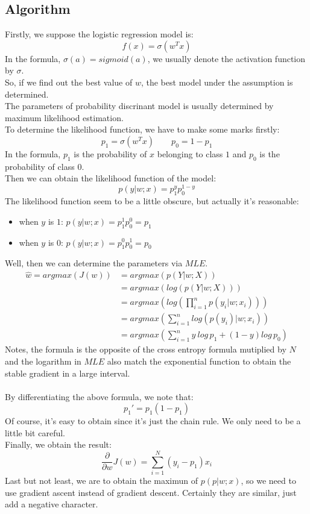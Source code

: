 \documentclass{report}
\begin{document}
\subsection{Algorithm}
Firstly, we suppose the logistic regression model is:
$$
f(x)=\sigma(w^Tx)
$$
In the formula, $\sigma(a)=sigmoid(a)$, we usually denote the activation function by $\sigma$.\\
So, if we find out the best value of $w$, the best model under the assumption is determined.\\
The parameters of probability discrinant model is usually determined by maximum likelihood estimation.\\
To determine the likelihood function, we have to make some marks firstly:
$$
p_1=\sigma(w^Tx) \qquad p_0=1-p_1
$$
In the formula, $p_1$ is the probability of $x$ belonging to class $1$ and $p_0$ is the probability of class $0$.\\
Then we can obtain the likelihood function of the model:
$$
p(y|w;x)=p_1^yp_0^{1-y}
$$
The likelihood function seem to be a little obscure, but actually it's reasonable:
\begin{itemize}
	\item when $y$ is $1$: $p(y|w;x)=p_1^1p_0^0=p_1$
	\item when $y$ is $0$: $p(y|w;x)=p_1^0p_0^1=p_0$
\end{itemize}
Well, then we can determine the parameters via $MLE$.
\begin{equation}
\begin{aligned}
\hat{w}=argmax(J(w))&=argmax(p(Y|w;X))\\
&=argmax(log(p(Y|w;X)))\\
&=argmax(log(\prod_{i=1}^n p(y_i|w;x_i)))\\
&=argmax(\sum_{i=1}^n log(p(y_i)|w;x_i))\\
&=argmax(\sum_{i=1}^n y\ log\, p_1+(1-y)log\,p_0)
\end{aligned}
\end{equation}
Notes, the formula is the opposite of the cross entropy formula mutiplied by $N$ and the logarithm in $MLE$ also match the exponential function to obtain the stable gradient in a large interval.\\\\
By differentiating the above formula, we note that:
$$
p_1'=p_1(1-p_1)
$$
Of course, it's easy to obtain since it's just the chain rule. We only need to be a little bit careful.\\
Finally, we obtain the result:
$$
\frac{\partial}{\partial w}J(w)=\sum_{i=1}^{N}\left(y_{i}-p_{1}\right) x_{i}
$$
Last but not least, we are to obtain the maximun of $p(p|w;x)$, so we need to use gradient ascent instead of gradient descent. Certainly they are similar, just add a negative character.
\newpage
\end{document}
